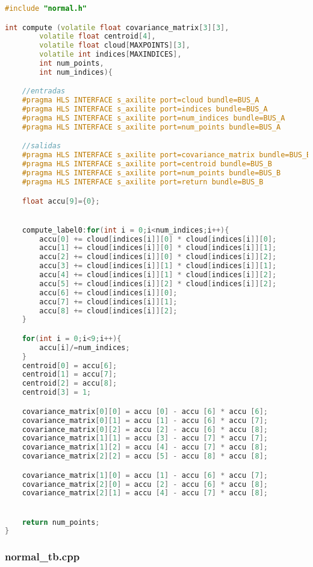  \begin{lstlisting}[language=C++,breaklines]
 #include "normal.h"

int compute (volatile float covariance_matrix[3][3],
		volatile float centroid[4],
		volatile float cloud[MAXPOINTS][3],
		volatile int indices[MAXINDICES],
		int num_points,
		int num_indices){

	//entradas
	#pragma HLS INTERFACE s_axilite port=cloud bundle=BUS_A
	#pragma HLS INTERFACE s_axilite port=indices bundle=BUS_A
	#pragma HLS INTERFACE s_axilite port=num_indices bundle=BUS_A
	#pragma HLS INTERFACE s_axilite port=num_points bundle=BUS_A

	//salidas
	#pragma HLS INTERFACE s_axilite port=covariance_matrix bundle=BUS_B
	#pragma HLS INTERFACE s_axilite port=centroid bundle=BUS_B
	#pragma HLS INTERFACE s_axilite port=num_points bundle=BUS_B
	#pragma HLS INTERFACE s_axilite port=return bundle=BUS_B

	float accu[9]={0};


	compute_label0:for(int i = 0;i<num_indices;i++){
		accu[0] += cloud[indices[i]][0] * cloud[indices[i]][0];
		accu[1] += cloud[indices[i]][0] * cloud[indices[i]][1];
		accu[2] += cloud[indices[i]][0] * cloud[indices[i]][2];
		accu[3] += cloud[indices[i]][1] * cloud[indices[i]][1];
		accu[4] += cloud[indices[i]][1] * cloud[indices[i]][2];
		accu[5] += cloud[indices[i]][2] * cloud[indices[i]][2];
		accu[6] += cloud[indices[i]][0];
		accu[7] += cloud[indices[i]][1];
		accu[8] += cloud[indices[i]][2];
	}

	for(int i = 0;i<9;i++){
		accu[i]/=num_indices;
	}
	centroid[0] = accu[6];
	centroid[1] = accu[7];
	centroid[2] = accu[8];
	centroid[3] = 1;

	covariance_matrix[0][0] = accu [0] - accu [6] * accu [6];
	covariance_matrix[0][1] = accu [1] - accu [6] * accu [7];
	covariance_matrix[0][2] = accu [2] - accu [6] * accu [8];
	covariance_matrix[1][1] = accu [3] - accu [7] * accu [7];
	covariance_matrix[1][2] = accu [4] - accu [7] * accu [8];
	covariance_matrix[2][2] = accu [5] - accu [8] * accu [8];

	covariance_matrix[1][0] = accu [1] - accu [6] * accu [7];
	covariance_matrix[2][0] = accu [2] - accu [6] * accu [8];
	covariance_matrix[2][1] = accu [4] - accu [7] * accu [8];


	return num_points;
}
\end{lstlisting}

\subsubsection{normal\_tb.cpp}

